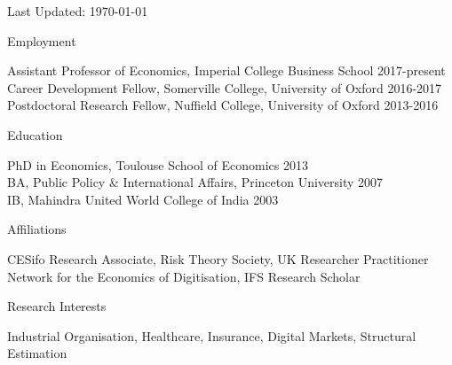 \documentclass{resume}
\begin{document}
\begin{center}
\scriptsize{Last Updated: \today}	
\end{center}





\begin{rSection}{Employment}

Assistant Professor of Economics, Imperial College Business School \hfill {2017-present} 
\\ Career Development Fellow, Somerville College, University of Oxford \hfill {2016-2017} 
\\ Postdoctoral Research Fellow, Nuffield College, University of Oxford \hfill {2013-2016} 	
	
\end{rSection}











\begin{rSection}{Education}

PhD in Economics, Toulouse School of Economics \hfill {2013} 
\\ BA, Public Policy \& International Affairs, Princeton University \hfill {2007}
\\ IB, Mahindra United World College of India \hfill{2003}

\end{rSection}








\begin{rSection}{Affiliations}

CESifo Research Associate, Risk Theory Society, UK Researcher Practitioner Network for the Economics of Digitisation, IFS Research Scholar
	
\end{rSection}









\begin{rSection}{Research Interests}

Industrial Organisation, Healthcare, Insurance, Digital Markets, Structural Estimation
	
\end{rSection}
\end{document}
